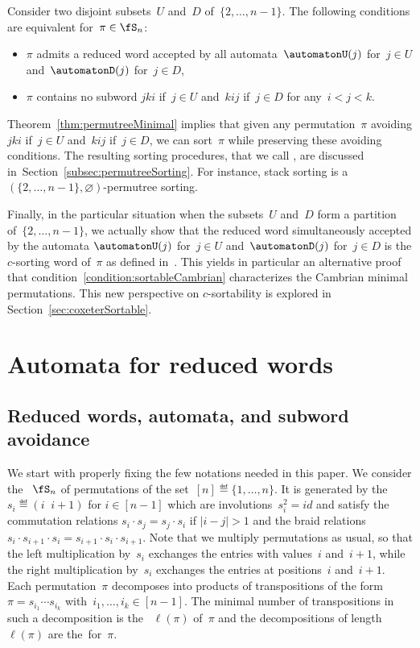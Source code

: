 \begin{theorem}\label{thm:permutreeMinimal}
Consider two disjoint subsets~$U$ and~$D$ of~$\{2, \dots, n-1\}$.
The following conditions are equivalent for~$\pi \in \fS_n$:
\begin{itemize}
	\item $\pi$ admits a reduced word accepted by all automata~$\automatonU(j)$ for~$j \in U$ and~$\automatonD(j)$ for~${j \in D}$,
	\item $\pi$ contains no subword $jki$ if~$j \in U$ and~$kij$ if~$j \in D$ for any~$i < j < k$.
\end{itemize}
\end{theorem}

Theorem~\ref{thm:permutreeMinimal} implies that given any permutation~$\pi$ avoiding $jki$ if~$j \in U$ and~$kij$ if~$j \in D$, we can sort~$\pi$ while preserving these avoiding conditions.
The resulting sorting procedures, that we call , are discussed in~Section~\ref{subsec:permutreeSorting}.
For instance, stack sorting is a $(\{2, \dots, n-1\}, \varnothing)$-permutree sorting.

Finally, in the particular situation when the subsets~$U$ and~$D$ form a partition of~$\{2, \dots, n-1\}$, we actually show that the reduced word simultaneously accepted by the automata $\automatonU(j)$ for~${j \in U}$ and~$\automatonD(j)$ for~$j \in D$ is the $c$-sorting word of~$\pi$ as defined in~\cite{Reading-coxeterSortable}.
This yields in particular an alternative proof that condition~\ref{condition:sortableCambrian} characterizes the Cambrian minimal permutations.
This new perspective on $c$-sortability is explored in Section~\ref{sec:coxeterSortable}.

\section{Automata for reduced words}\label{sec:proofPatternAvoidance}

\subsection{Reduced words, automata, and subword avoidance}

We start with properly fixing the few notations needed in this paper.
We consider the ~$\fS_n$ of permutations of the set~$[n] \eqdef \{1,\dots,n\}$.
It is generated by the ~$s_i \eqdef (i \;\; i+1)$ for $i \in [n-1]$ which are involutions~$s_i^2 = id$ and satisfy the commutation relations $s_i \cdot s_j =s_j \cdot s_i$ if $|i-j|>1$ and the braid relations~$s_i \cdot s_{i+1} \cdot s_i = s_{i+1} \cdot s_i \cdot s_{i+1}$.
Note that we multiply permutations as usual, so that the left multiplication by~$s_i$ exchanges the entries with values~$i$ and~$i+1$, while the right multiplication by~$s_i$ exchanges the entries at positions~$i$ and~$i+1$.
Each permutation~$\pi$ decomposes into products of transpositions of the form~$\pi = s_{i_1} \cdots s_{i_k}$ with~$i_1, \dots, i_k \in [n-1]$.
The minimal number of transpositions in such a decomposition is the ~$\ell(\pi)$ of~$\pi$ and the decompositions of length~$\ell(\pi)$ are \mbox{the  for~$\pi$}.

